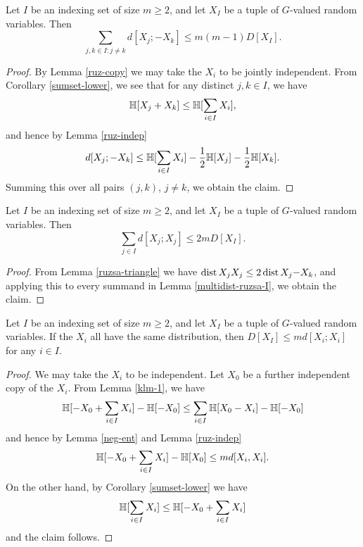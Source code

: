 \begin{lemma}\label{multidist-ruzsa-I}
  Let $I$ be an indexing set of size $m \ge 2$, and let $X_{I}$ be a tuple of $G$-valued random variables. Then
  $$\sum_{j,k \in I: j \neq k} d[X_j; -X_k] \leq m(m-1) D[X_I].$$
\end{lemma}

\begin{proof}
By Lemma \ref{ruz-copy} we may take the $X_i$ to be jointly independent.  From Corollary \ref{sumset-lower}, we see that for any distinct $j,k \in I$, we have
  \[
    \mathbb{H}[X_j+X_k] \leq \mathbb{H}[\sum_{i \in I} X_i],
  \]
  and hence by Lemma \ref{ruz-indep}
  \[
    d[X_j;-X_k] \leq \mathbb{H}[\sum_{i \in I} X_i] - \frac{1}{2} \mathbb{H}[X_j] - \frac{1}{2} \mathbb{H}[X_k].
  \]
  Summing this over all pairs $(j,k)$, $j \neq k$, we obtain the claim.
\end{proof}

\begin{lemma}\label{multidist-ruzsa-II}
  Let $I$ be an indexing set of size $m \ge 2$, and let $X_{I}$ be a tuple of $G$-valued random variables. Then
  $$\sum_{j \in I} d[X_j;X_j] \leq 2 m D[X_I].$$
\end{lemma}

\begin{proof}
From Lemma \ref{ruzsa-triangle} we have $\operatorname{dist}{X_j}{X_j} \leq 2 \operatorname{dist}{X_j}{-X_k}$, and applying this to every summand in Lemma \ref{multidist-ruzsa-I}, we obtain the claim.
\end{proof}

\begin{lemma}\label{multidist-ruzsa-III}
  Let $I$ be an indexing set of size $m \ge 2$, and let $X_{I}$ be a tuple of $G$-valued random variables. If the $X_i$ all have the same distribution, then $D[X_I] \leq m d[X_i;X_i]$ for any $i \in I$.
\end{lemma}

\begin{proof}
  We may take the $X_i$ to be independent.  Let $X_0$ be a further independent copy of the $X_i$.
From Lemma \ref{klm-1}, we have
$$ \mathbb{H}[-X_0 + \sum_{i \in I} X_i] - \mathbb{H}[-X_0] \leq \sum_{i \in I} \mathbb{H}[X_0 - X_i] - \mathbb{H}[-X_0]$$
and hence by Lemma \ref{neg-ent} and Lemma \ref{ruz-indep}
$$ \mathbb{H}[-X_0 + \sum_{i \in I} X_i] - \mathbb{H}[X_0] \leq m d[X_i,X_i].$$
On the other hand, by Corollary \ref{sumset-lower} we have
$$ \mathbb{H}[\sum_{i \in I} X_i] \leq \mathbb{H}[-X_0 + \sum_{i \in I} X_i]$$
and the claim follows.
\end{proof}

